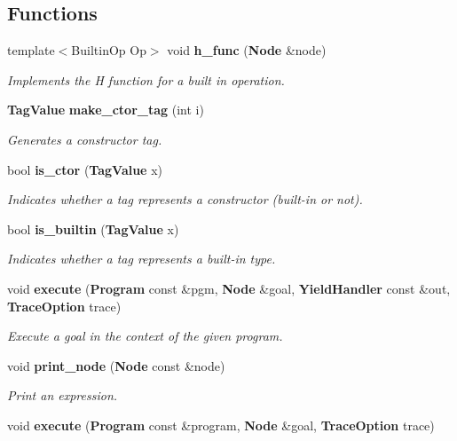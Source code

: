 \subsection*{Functions}
\begin{CompactItemize}
\item 
template$<$Builtin\-Op Op$>$ void {\bf h\_\-func} ({\bf Node} \&node)\label{namespacesprite_a44}

\begin{CompactList}\small\item\em Implements the H function for a built in operation. \item\end{CompactList}\item 
{\bf Tag\-Value} {\bf make\_\-ctor\_\-tag} (int i)\label{namespacesprite_a45}

\begin{CompactList}\small\item\em Generates a constructor tag. \item\end{CompactList}\item 
bool {\bf is\_\-ctor} ({\bf Tag\-Value} x)\label{namespacesprite_a46}

\begin{CompactList}\small\item\em Indicates whether a tag represents a constructor (built-in or not). \item\end{CompactList}\item 
bool {\bf is\_\-builtin} ({\bf Tag\-Value} x)\label{namespacesprite_a47}

\begin{CompactList}\small\item\em Indicates whether a tag represents a built-in type. \item\end{CompactList}\item 
void {\bf execute} ({\bf Program} const \&pgm, {\bf Node} \&goal, {\bf Yield\-Handler} const \&out, {\bf Trace\-Option} trace)
\begin{CompactList}\small\item\em Execute a goal in the context of the given program. \item\end{CompactList}\item 
void {\bf print\_\-node} ({\bf Node} const \&node)
\begin{CompactList}\small\item\em Print an expression. \item\end{CompactList}\item 
void {\bf execute} ({\bf Program} const \&program, {\bf Node} \&goal, {\bf Trace\-Option} trace)\label{namespacesprite_a51}


\end{CompactItemize}

